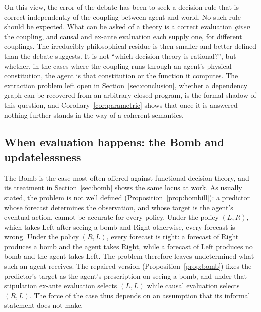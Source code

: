 On this view, the error of the debate has been to seek a decision rule that is correct independently
of the coupling between agent and world. No such rule should be expected. What can be asked of a
theory is a correct evaluation \emph{given} the coupling, and causal and ex-ante evaluation each
supply one, for different couplings. The irreducibly philosophical residue is then smaller and better
defined than the debate suggests. It is not \enquote{which decision theory is rational?}, but whether,
in the cases where the coupling runs through an agent's physical constitution, the agent is that
constitution or the function it computes. The extraction problem left open in
Section~\ref{sec:conclusion}, whether a dependency graph can be recovered from an arbitrary closed
program, is the formal shadow of this question, and Corollary~\ref{cor:parametric} shows that once it
is answered nothing further stands in the way of a coherent semantics.

\subsection{When evaluation happens: the Bomb and updatelessness}\label{sec:disc-bomb}

The Bomb is the case most often offered against functional decision theory, and its treatment in
Section~\ref{sec:bomb} shows the same locus at work. As usually stated, the problem is not well
defined (Proposition~\ref{prop:bombill}): a predictor whose forecast determines the observation, and
whose target is the agent's eventual action, cannot be accurate for every policy. Under the policy
$(L,R)$, which takes Left after seeing a bomb and Right otherwise, every forecast is wrong. Under the
policy $(R,L)$, every forecast is right: a forecast of Right produces a bomb and the agent takes
Right, while a forecast of Left produces no bomb and the agent takes Left. The problem therefore
leaves undetermined what such an agent receives. The repaired version
(Proposition~\ref{prop:bomb}) fixes the predictor's target as the agent's prescription on seeing a
bomb, and under that stipulation ex-ante evaluation selects $(L,L)$ while causal evaluation selects
$(R,L)$. The force of the case thus depends on an assumption that its informal statement does not
make.

